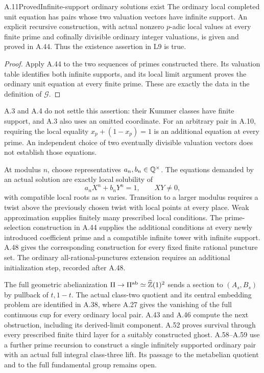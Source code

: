 \begin{statement}{A.11}{Proved}{Infinite-support ordinary solutions exist}
The ordinary local completed unit equation has pairs whose two
valuation vectors have infinite support. An explicit recursive
construction, with actual nonzero $p$-adic local values at every finite
prime and cofinally divisible ordinary integer valuations, is given
and proved in A.44. Thus the existence assertion in L9 is true.
\end{statement}
\begin{proof}
Apply A.44 to the two sequences of primes constructed there. Its
valuation table identifies both infinite supports, and its local
limit argument proves the ordinary unit equation at every finite
prime. These are exactly the data in the definition of $\mathcal G$.
\end{proof}
A.3 and A.4 do not settle this assertion: their Kummer classes have
finite support, and A.3 also uses an omitted coordinate.
For an arbitrary pair in A.10, requiring the local equality
$x_p+(1-x_p)=1$ is an additional equation at every prime.
An independent choice of two eventually divisible valuation
vectors does not establish those equations.

At modulus $n$, choose representatives $a_n,b_n\in\mathbb Q^\times$.
The equations demanded by an actual solution are exactly local
solubility of
\[
             a_n X^n+b_n Y^n=1,\qquad XY\ne0,
\]
with compatible local roots as $n$ varies. Transition to a larger
modulus requires a twist above the previously chosen twist with
local points at every place. Weak approximation supplies finitely
many prescribed local conditions. The prime-selection construction in
A.44 supplies the additional conditions at every newly introduced
coefficient prime and a compatible infinite tower with infinite support.
A.48 gives the corresponding construction for every fixed finite
rational puncture set. The ordinary all-rational-punctures extension
requires an additional initialization step, recorded after A.48.

The full geometric abelianization
$\Pi\to\Pi^{\rm ab}\simeq\widehat{\mathbb Z}(1)^2$ sends a section to
$(A_s,B_s)$ by pullback of $t,1-t$. The actual class-two quotient
and its central embedding problem are identified in A.38, where
A.27 gives the vanishing of the full continuous cup for every
ordinary local pair. A.43 and A.46 compute the next obstruction,
including its derived-limit component. A.52 proves survival through
every prescribed finite third layer for a suitably constructed ghost.
A.58--A.59 use a further prime recursion to construct a single
infinitely supported ordinary pair with an actual full integral
class-three lift. Its passage to the metabelian quotient and to
the full fundamental group remains open.
